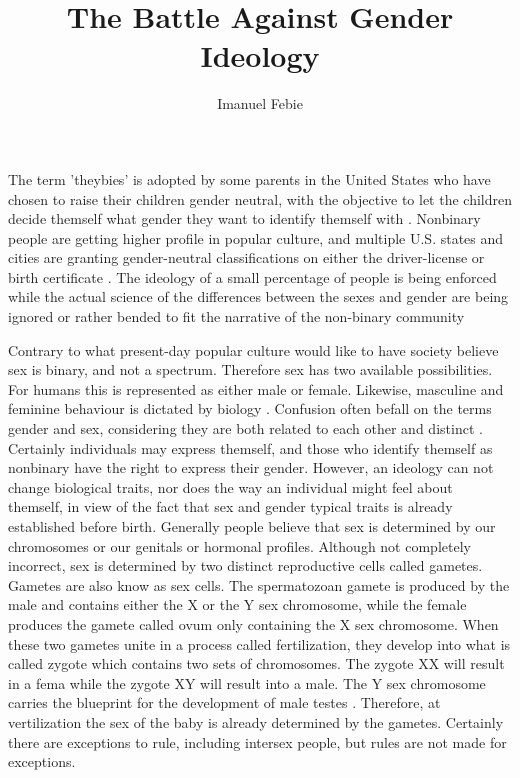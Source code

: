 \documentclass[12pt]{article}
\begin{document}
\title{The Battle Against Gender Ideology}
\author{Imanuel Febie}
\maketitle

The term 'theybies' is adopted by some parents in the United States who have chosen to raise their children gender neutral, with the objective to let the children decide themself what gender they want to identify themself with \cite{raisingTheybies}. Nonbinary people are getting higher profile in popular culture, and multiple U.S. states and cities are granting gender-neutral classifications on either the driver-license or birth certificate \cite{nonbinaryGenderAwareness}. The ideology of a small percentage of people is being enforced while the actual science of the differences between the sexes and gender are being ignored or rather bended to fit the narrative of the non-binary community

Contrary to what present-day popular culture would like to have society believe sex is binary, and not a spectrum. Therefore sex has two available possibilities. For humans this is represented as either male or female. Likewise, masculine and feminine behaviour is dictated by biology \cite{personalityAndGenderDifferences}. Confusion often befall on the terms gender and sex, considering they are both related to each other and distinct \cite{psychosexualDifferentiation}. Certainly individuals may express themself, and those who identify themself as nonbinary have the right to express their gender. However, an ideology can not change biological traits, nor does the way an individual might feel about themself, in view of the fact that sex and gender typical traits is already established before birth. Generally people believe that sex is determined by our chromosomes or our genitals or hormonal profiles. Although not completely incorrect, sex is determined by two distinct reproductive cells called gametes. Gametes are also know as sex cells. The spermatozoan gamete is produced by the male and contains either the X or the Y sex chromosome, while the female produces the gamete called ovum only containing the X sex chromosome. When these two gametes unite in a process called fertilization, they develop into what is called zygote which contains two sets of chromosomes. The zygote XX will result in a fema while the zygote XY will result into a male. The Y sex chromosome carries the blueprint for the development of male testes \cite{endOfGender2020Soh}. Therefore, at vertilization the sex of the baby is already determined by the gametes. Certainly there are exceptions to rule, including intersex people, but rules are not made for exceptions.   
\end{document}
